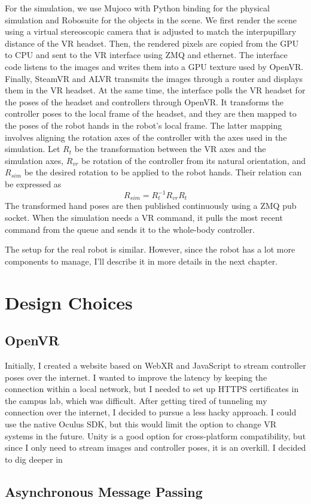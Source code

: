 For the simulation, we use Mujoco with Python binding for the physical simulation and Robosuite for the objects in the scene. We first render the scene using a virtual stereoscopic camera that is adjusted to match the interpupillary distance of the VR headset. Then, the rendered pixels are copied from the GPU to CPU and sent to the VR interface using ZMQ and ethernet. The interface code listens to the images and writes them into a GPU texture used by OpenVR. Finally, SteamVR and ALVR transmits the images through a router and displays them in the VR headset. At the same time, the interface polls the VR headset for the poses of the headset and controllers through OpenVR. It transforms the controller poses to the local frame of the headset, and they are then mapped to the poses of the robot hands in the robot's local frame. The latter mapping involves aligning the rotation axes of the controller with the axes used in the simulation. Let $R_t$ be the transformation between the VR axes and the simulation axes, $R_{vr}$ be rotation of the controller from its natural orientation, and $R_{sim}$ be the desired rotation to be applied to the robot hands. Their relation can be expressed as 
$$
R_{sim} = R_t^{-1} R_{vr} R_t
$$
The transformed hand poses are then published continuously using a ZMQ pub socket. When the simulation needs a VR command, it pulls the most recent command from the queue and sends it to the whole-body controller. 

The setup for the real robot is similar. However, since the robot has a lot more components to manage, I'll describe it in more details in the next chapter.

\section{Design Choices}

\subsection{OpenVR}
Initially, I created a website based on WebXR and JavaScript to stream controller poses over the internet. I wanted to improve the latency by keeping the connection within a local network, but I needed to set up HTTPS certificates in the campus lab, which was difficult. After getting tired of tunneling my connection over the internet, I decided to pursue a less hacky approach. 
I could use the native Oculus SDK, but this would limit the option to change VR systems in the future. Unity is a good option for cross-platform compatibility, but since I only need to stream images and controller poses, it is an overkill. I decided to dig deeper in 

\subsection{Asynchronous Message Passing}
